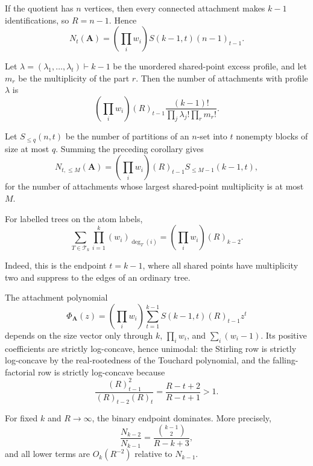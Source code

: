 If the quotient has $n$ vertices, then every connected attachment makes
$k-1$ identifications, so $R=n-1$.  Hence
\[
N_t(\mathbf A)
=
\left(\prod_iw_i\right)S(k-1,t)(n-1)_{t-1}.
\tag{10.20}
\]

\begin{corollary}
\label{corollary-profile-refined-attachment-count}
Let $\lambda=(\lambda_1,\ldots,\lambda_t)\vdash k-1$ be the unordered
shared-point excess profile, and let $m_r$ be the multiplicity of the part $r$.
Then the number of attachments with profile $\lambda$ is
\[
\boxed{
\left(\prod_iw_i\right)(R)_{t-1}
\frac{(k-1)!}{\prod_j\lambda_j!\prod_rm_r!}.
}
\]
\end{corollary}

Let $S_{\le q}(n,t)$ be the number of partitions of an $n$-set into $t$
nonempty blocks of size at most $q$.  Summing the preceding corollary gives
\[
N_{t,\le M}(\mathbf A)
=
\left(\prod_iw_i\right)(R)_{t-1}
S_{\le M-1}(k-1,t),
\tag{10.21}
\]
for the number of attachments whose largest shared-point multiplicity is at
most $M$.

\begin{corollary}
\label{corollary-injective-port-cayley}
For labelled trees on the atom labels,
\[
\boxed{
\sum_{T\in\mathcal T_k}\prod_{i=1}^k(w_i)_{\deg_T(i)}
=
\left(\prod_iw_i\right)(R)_{k-2}.
}
\]
\end{corollary}

Indeed, this is the endpoint $t=k-1$, where all shared points have
multiplicity two and suppress to the edges of an ordinary tree.

The attachment polynomial
\[
\Phi_{\mathbf A}(z)
=
\left(\prod_iw_i\right)
\sum_{t=1}^{k-1}S(k-1,t)(R)_{t-1}z^t
\]
depends on the size vector only through $k$, $\prod_iw_i$, and
$\sum_i(w_i-1)$.  Its positive coefficients are strictly log-concave, hence
unimodal: the Stirling row is strictly log-concave by the real-rootedness of
the Touchard polynomial, and the falling-factorial row is strictly
log-concave because
\[
\frac{(R)_{t-1}^2}{(R)_{t-2}(R)_t}
=
\frac{R-t+2}{R-t+1}>1.
\]

For fixed $k$ and $R\to\infty$, the binary endpoint dominates.  More precisely,
\[
\frac{N_{k-2}}{N_{k-1}}
=
\frac{\binom{k-1}{2}}{R-k+3},
\]
and all lower terms are $O_k(R^{-2})$ relative to $N_{k-1}$.
